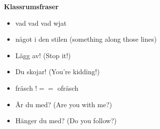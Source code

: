 
\begin{flushleft}
    \textbf{Klassrumsfraser}
    \begin{itemize}
        \item vad vad vad wjat
        \item något i den stilen (something along those lines)
        \item Lägg av! (Stop it!)
        \item Du skojar! (You're kidding!)
        \item fräsch $!==$ ofräsch
        \item Är du med? (Are you with me?)
        \item Hänger du med? (Do you follow?)
    \end{itemize}
\end{flushleft}

